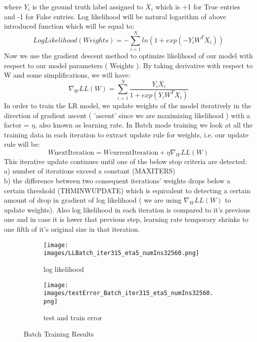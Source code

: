 \documentclass[a4paper,11pt]{article}
\begin{document}
where $Y_i$ is the ground truth label assigned to $X_i$ which is +1 for True entries and -1 for False entries. Log likelihood will be natural logarithm of above introduced function which will be equal to:
\begin{equation}
LogLikelihood ( Weights )  = - \sum_{i=1}^{N}ln(1+exp(-Y_iW^TX_i))
\end{equation}
Now we use the gradient descent method to optimize likelihood of our model with respect to our model parameters ( Weights ). By taking derivative with respect to W and some simplifications, we will have:
\begin{equation}
\nabla _W LL (W) = \sum_{i=1}^{N}\frac{Y_iX_i}{1+exp(Y_iW^TX_i)} 
\end{equation}
In order to train the LR model, we update weights of the model iteratively in the direction of gradient ascent ( 'ascent' since we are maximizing likelihood ) with a factor = $\eta$, also known as learning rate. In Batch mode training we look at all the training data in each iteration to extract update rule for weights, i.e. our update rule will be:
\begin{equation}
W\textrm{nextIteration} = W\textrm{currentIteration} + \eta \nabla _W LL(W)
\end{equation}
This iterative update continues until one of the below stop criteria are detected:\\
a) number of iterations exceed a constant (MAX\underline{\hspace{.2cm}}ITERS) \\
b) the difference between two consequent iterations' weights drops below a certain threshold (TH\underline{\hspace{.2cm}}MIN\underline{\hspace{.2cm}}W\underline{\hspace{.2cm}}UPDATE) which is equivalent to detecting a certain amount of drop in gradient of log likelihood ( we are using $\nabla _W LL (W)$ to update weights).\newline
Also log likelihood in each iteration is compared to it's previous one and in case it is lower that previous step, learning rate temporary shrinks to one fifth of it's original size in that iteration. 
\begin{figure}[t]

\begin{subfigure}{.5\textwidth}

  \texttt{[image: images/LLBatch\_iter315\_eta5\_numIns32560.png]}
	\centering
  \caption{log likelihood }
  \label{fig:batch_loglikelihood}
\end{subfigure}
\begin{subfigure}{.5\textwidth}

  \texttt{[image: images/testError\_Batch\_iter315\_eta5\_numIns32560.png]}
	\centering
  \caption{test and train error }
  \label{fig:batch_errors}
\end{subfigure}

  \caption{Batch Training Results}
\end{figure}
\end{document}
